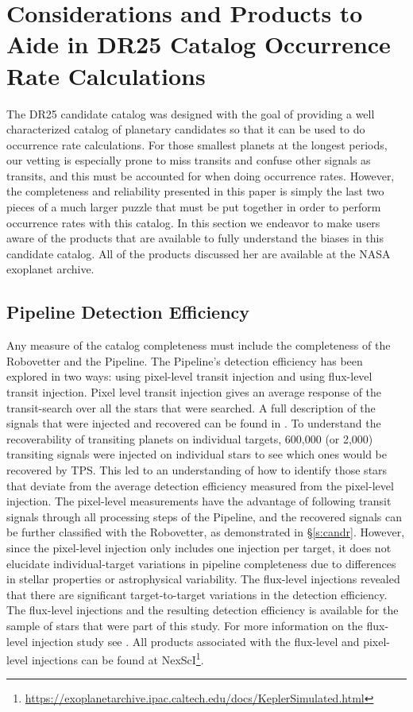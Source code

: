 \section{Considerations and Products to Aide in DR25 Catalog Occurrence Rate Calculations}
\label{s:occurates}
The DR25 candidate catalog was designed with the goal of providing a well characterized catalog of planetary candidates so that it can be used to do occurrence rate calculations.  For those smallest planets at the longest periods, our vetting is especially prone to miss transits and confuse other signals as transits, and this must be accounted for when doing occurrence rates.  However, the completeness and reliability presented in this paper is simply the last two pieces of a much larger puzzle that must be put together in order to perform occurrence rates with this catalog.  In this section we endeavor to make users aware of the products that are available to fully understand the biases in this candidate catalog.  All of the products discussed her are available at the NASA exoplanet archive. 

\subsection{Pipeline Detection Efficiency}
Any measure of the catalog completeness must include the completeness of the Robovetter and the \Kepler{} Pipeline.  The Pipeline's detection efficiency has been explored in two ways: using pixel-level transit injection and using flux-level transit injection.  Pixel level transit injection gives an average response of the transit-search over all the stars that were searched. A full description of the signals that were injected and recovered can be found in \citet{Christiansen2017}.  To understand the recoverability of transiting planets on individual targets, 600,000 (or 2,000) transiting signals were injected on individual stars to see which ones would be recovered by TPS.  This led to an understanding of how to identify those stars that deviate from the average detection efficiency measured from the pixel-level injection.  The pixel-level measurements have the advantage of following transit signals through all processing steps of the \Kepler{} Pipeline, and the recovered signals can be further classified with the Robovetter, as demonstrated in \S\ref{s:candr}.  However, since the pixel-level injection only includes one injection per target, it does not elucidate individual-target variations in pipeline completeness due to differences in stellar properties or astrophysical variability. The flux-level injections revealed  that  there  are  significant target-to-target variations in the detection efficiency. The flux-level injections and the resulting detection efficiency is available for the sample of stars that were part of this study. For more information on the flux-level injection study see \citet{Burke2017c}. All products associated with the flux-level and pixel-level injections can be found at NexScI\footnote{\url{https://exoplanetarchive.ipac.caltech.edu/docs/KeplerSimulated.html}}.

